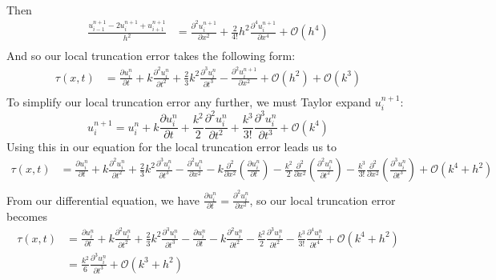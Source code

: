 \documentclass{article}
\begin{document}
\begin{itemize}
\begin{align*}
    \end{align*}
    Then
    \begin{align*}
        \frac{u_{i-1}^{n+1} - 2u_i^{n+1} + u_{i+1}^{n+1}}{h^2} &= \frac{\partial^2 u_i^{n+1}}{\partial x^2} + \frac{2}{4!}h^2\frac{\partial^4 u_i^{n+1}}{\partial x^4} + \mathcal{O}(h^4) \\
    \end{align*}
    And so our local truncation error takes the following form:
    \begin{align*}
        \tau(x,t) &= \frac{\partial u_i^n}{\partial t} + k\frac{\partial^2 u_i^n}{\partial t^2} + \frac{2}{3}k^2\frac{\partial^3u_i^n}{\partial t^3} - \frac{\partial^2 u_i^{n+1}}{\partial x^2} + \mathcal{O}(h^2) + \mathcal{O}(k^3) \\
    \end{align*}
    To simplify our local truncation error any further, we must Taylor expand $u_i^{n+1}$:
    \[u_i^{n+1} = u_i^n + k\frac{\partial u_i^n}{\partial t} + \frac{k^2}{2}\frac{\partial^2u_i^n}{\partial t^2} + \frac{k^3}{3!}\frac{\partial^3u^n_i}{\partial t^3} + \mathcal{O}(k^4)\]
    Using this in our equation for the local truncation error leads us to
    \begin{align*}
        \tau(x,t) &= \frac{\partial u_i^n}{\partial t} + k\frac{\partial^2 u_i^n}{\partial t^2} + \frac{2}{3}k^2\frac{\partial^3u_i^n}{\partial t^3} - \frac{\partial^2u^n_i}{\partial x^2} - k\frac{\partial^2}{\partial x^2}\left(\frac{\partial u_i^n}{\partial t}\right) - \frac{k^2}{2}\frac{\partial^2}{\partial x^2}\left(\frac{\partial^2u_i^n}{\partial t^2}\right) - \frac{k^3}{3!}\frac{\partial^2}{\partial x^2}\left(\frac{\partial^3u_i^n}{\partial t^3}\right) + \mathcal{O}(k^4 + h^2) \\
    \end{align*}
    From our differential equation, we have $\frac{\partial u_i^n}{\partial t} = \frac{\partial^2u_i^n}{\partial x^2}$, so our local truncation error becomes
    \begin{align*}
        \tau(x,t) &= \frac{\partial u_i^n}{\partial t} + k\frac{\partial^2 u_i^n}{\partial t^2} + \frac{2}{3}k^2\frac{\partial^3u_i^n}{\partial t^3} - \frac{\partial u^n_i}{\partial t} - k\frac{\partial^2u_i^n}{\partial t^2} - \frac{k^2}{2}\frac{\partial^3u_i^n}{\partial t^2} - \frac{k^3}{3!}\frac{\partial^4 u_i^n}{\partial t^4} + \mathcal{O}(k^4 + h^2) \\
        &= \frac{k^2}{6}\frac{\partial^3u_i^n}{\partial t^3} + \mathcal{O}(k^3 + h^2) \\

\end{align*}
\end{itemize}
\end{document}
